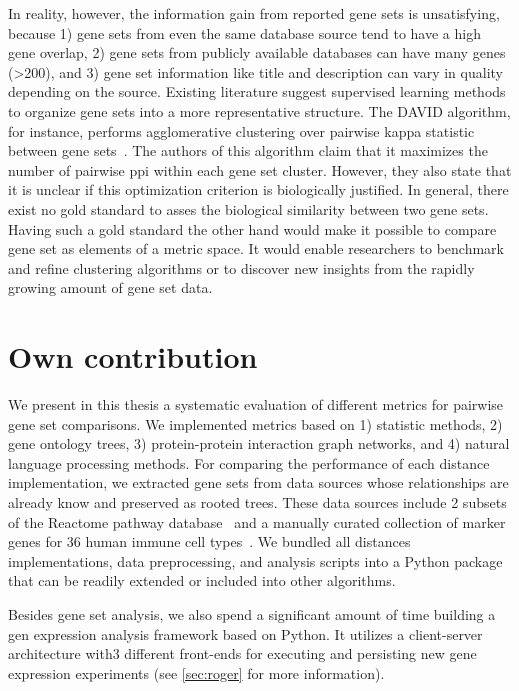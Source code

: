 \documentclass{thesisclass}
\begin{document}
In reality, however, the information gain from reported gene sets is unsatisfying, because 
1) gene sets from even the same database source tend to have a high gene overlap, 
2) gene sets from publicly available databases can have many genes (>200), and 
3) gene set information like title and description can vary in quality depending on the source.
Existing literature suggest supervised learning methods to organize gene sets into a more representative structure. The DAVID algorithm, for instance, performs agglomerative clustering over pairwise kappa statistic between gene sets~\cite{Huang2007}. The authors of this algorithm claim that it maximizes the number of pairwise \acrfull{ppi} within each gene set cluster. However, they also state that it is unclear if this optimization criterion is biologically justified. In general, there exist no gold standard to asses the biological similarity between two gene sets. Having such a gold standard the other hand would make it possible to compare gene set as elements of a metric space. It would enable researchers to benchmark and refine clustering algorithms or to discover new insights from the rapidly growing amount of gene set data.

\section{Own contribution}

We present in this thesis a systematic evaluation of different metrics for pairwise gene set comparisons. We implemented metrics based on 1) statistic methods, 2) gene ontology trees, 3) protein-protein interaction graph networks, and 4) natural language processing methods. For comparing the performance of each distance implementation, we extracted gene sets from data sources whose relationships are already know and preserved as rooted trees. These data sources include 2 subsets of the Reactome pathway database~\cite{doi:10.1093/nar/gki072} and a manually curated collection of marker genes for 36 human immune cell types~\cite{Sturm463828}. We bundled all distances implementations, data preprocessing, and analysis scripts into a Python package that can be readily extended or included into other algorithms.

Besides gene set analysis, we also spend a significant amount of time building a gen expression analysis framework based on Python. It utilizes a client-server architecture with3 different front-ends for executing and persisting new gene expression experiments (see \cref{sec:roger} for more information).
\end{document}
